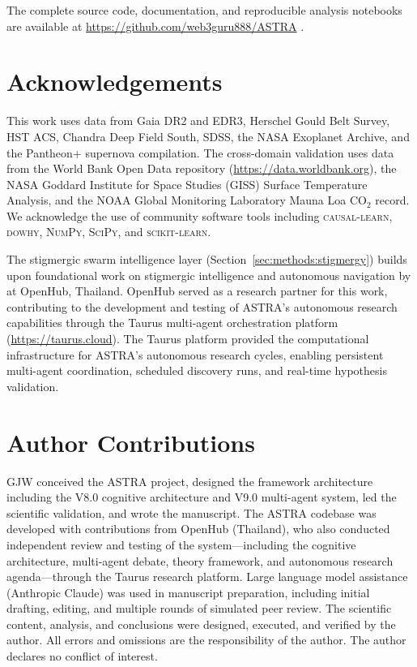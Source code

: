 \documentclass[usenatbib]{rasti}
\begin{document}
The complete source code, documentation, and reproducible analysis notebooks are available at \url{https://github.com/web3guru888/ASTRA} \citep{White2026}.

\section*{Acknowledgements}

This work uses data from Gaia DR2 and EDR3, Herschel Gould Belt Survey, HST ACS, Chandra Deep Field South, SDSS, the NASA Exoplanet Archive, and the Pantheon+ supernova compilation.
The cross-domain validation uses data from the World Bank Open Data repository (\url{https://data.worldbank.org}), the NASA Goddard Institute for Space Studies (GISS) Surface Temperature Analysis, and the NOAA Global Monitoring Laboratory Mauna Loa CO$_{2}$ record.
We acknowledge the use of community software tools including \textsc{causal-learn}, \textsc{dowhy}, \textsc{NumPy}, \textsc{SciPy}, and \textsc{scikit-learn}.

The stigmergic swarm intelligence layer (Section~\ref{sec:methods:stigmergy}) builds upon foundational work on stigmergic intelligence and autonomous navigation by \citet{Dey2025} at OpenHub, Thailand.
OpenHub served as a research partner for this work, contributing to the development and testing of ASTRA's autonomous research capabilities through the Taurus multi-agent orchestration platform (\url{https://taurus.cloud}).
The Taurus platform provided the computational infrastructure for ASTRA's autonomous research cycles, enabling persistent multi-agent coordination, scheduled discovery runs, and real-time hypothesis validation.

\section*{Author Contributions}

GJW conceived the ASTRA project, designed the framework architecture including the V8.0 cognitive architecture and V9.0 multi-agent system, led the scientific validation, and wrote the manuscript.
The ASTRA codebase was developed with contributions from OpenHub (Thailand), who also conducted independent review and testing of the system---including the cognitive architecture, multi-agent debate, theory framework, and autonomous research agenda---through the Taurus research platform.
Large language model assistance (Anthropic Claude) was used in manuscript preparation, including initial drafting, editing, and multiple rounds of simulated peer review.
The scientific content, analysis, and conclusions were designed, executed, and verified by the author.
All errors and omissions are the responsibility of the author.
The author declares no conflict of interest.
\end{document}
